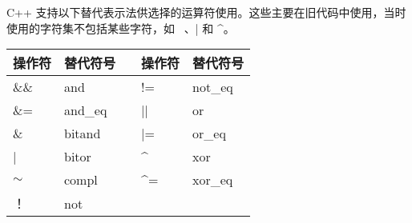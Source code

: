 
C++ 支持以下替代表示法供选择的运算符使用。这些主要在旧代码中使用，当时使用的字符集不包括某些字符，如 ~、| 和 \^{}。

\begin{longtable}{|l|l|l|l|l|}
\hline
\textbf{操作符} & \textbf{替代符号} && \textbf{操作符} & \textbf{替代符号} \\ \hline
\endfirsthead
%
\endhead
%
\&\&   & and     && !=                  & not\_eq \\ \hline
\&=    & and\_eq && ||                  & or      \\ \hline
\&     & bitand  && |=                  & or\_eq  \\ \hline
|      & bitor   && \textasciicircum{}  & xor     \\ \hline
$\sim$ & compl   && \textasciicircum{}= & xor\_eq \\ \hline
！     & not     &&                     &         \\ \hline
\end{longtable}




